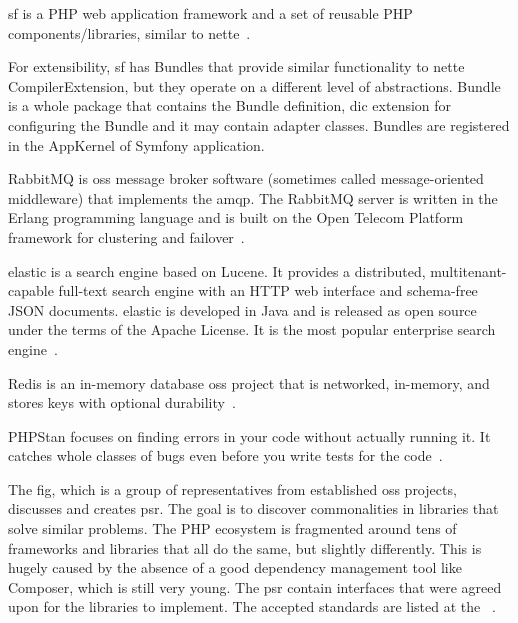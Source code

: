  \label{sec:theory:symfony}

\gls{sf} is a PHP web application framework and a set of reusable PHP components/libraries, similar to \gls{nette}~\cite{wiki:symfony}.

For extensibility, \gls{sf} has Bundles that provide similar functionality to \gls{nette} CompilerExtension, but they operate on a different level of abstractions. Bundle is a whole package that contains the Bundle definition, \gls{dic} extension for configuring the Bundle and it may contain adapter classes. Bundles are registered in the AppKernel of Symfony application.

 \label{sec:theory:rabbitmq}

RabbitMQ is \gls{oss} message broker software (sometimes called message-oriented middleware) that implements the \gls{amqp}. The RabbitMQ server is written in the Erlang programming language and is built on the Open Telecom Platform framework for clustering and failover~\cite{wiki:rabbitmq}.

 \label{sec:theory:elasticsearch}

\gls{elastic} is a search engine based on Lucene. It provides a distributed, multitenant-capable full-text search engine with an HTTP web interface and schema-free JSON documents. \gls{elastic} is developed in Java and is released as open source under the terms of the Apache License. It is the most popular enterprise search engine~\cite{wiki:elasticsearch}.

 \label{sec:theory:redis}

Redis is an in-memory database \gls{oss} project that is networked, in-memory, and stores keys with optional durability~\cite{wiki:redis}.

 \label{sec:theory:phpstan}

PHPStan focuses on finding errors in your code without actually running it. It catches whole classes of bugs even before you write tests for the code~\cite{github:phpstan}.

 \label{sec:theory:psr}

The \gls{fig}, which is a group of representatives from established \gls{oss} projects, discusses and creates \gls{psr}. The goal is to discover commonalities in libraries that solve similar problems. The PHP ecosystem is fragmented around tens of frameworks and libraries that all do the same, but slightly differently. This is hugely caused by the absence of a good dependency management tool like Composer, which is still very young. The \gls{psr} contain interfaces that were agreed upon for the libraries to implement. The accepted standards are listed at the ~\cite{fig:psr}.

